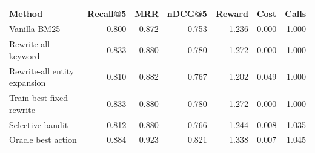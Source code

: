 \begin{tabular}{lrrrrrr}
\toprule
Method & Recall@5 & MRR & nDCG@5 & Reward & Cost & Calls \\
\midrule
Vanilla BM25 & 0.800 & 0.872 & 0.753 & 1.236 & 0.000 & 1.000 \\
Rewrite-all keyword & 0.833 & 0.880 & 0.780 & 1.272 & 0.000 & 1.000 \\
Rewrite-all entity expansion & 0.810 & 0.882 & 0.767 & 1.202 & 0.049 & 1.000 \\
Train-best fixed rewrite & 0.833 & 0.880 & 0.780 & 1.272 & 0.000 & 1.000 \\
Selective bandit & 0.812 & 0.880 & 0.766 & 1.244 & 0.008 & 1.035 \\
Oracle best action & 0.884 & 0.923 & 0.821 & 1.338 & 0.007 & 1.045 \\
\bottomrule
\end{tabular}
